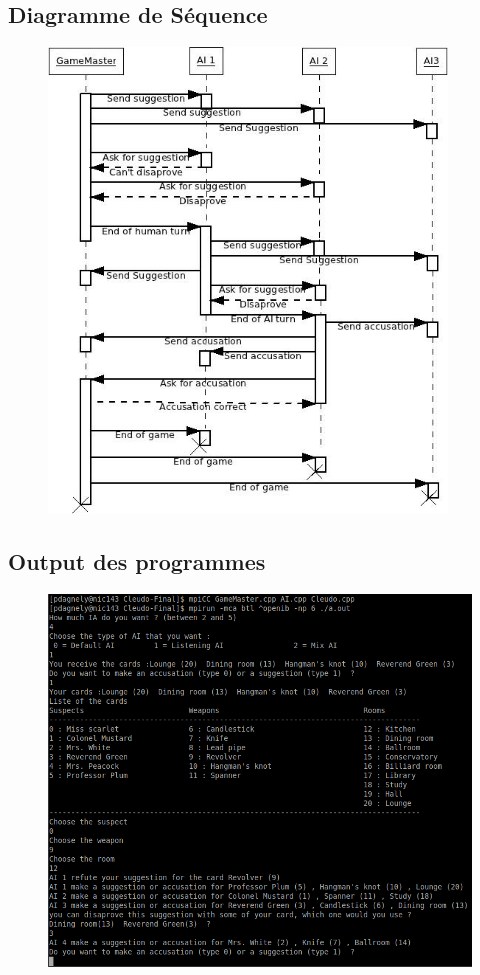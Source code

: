\documentclass[a4paper,10pt]{article}
\begin{document}
	\subsection{Diagramme de Séquence}\hypertarget{seqDiag}{}
		\begin{figure}[H] \hspace*{-2cm} 
    	\centering
   		  \includegraphics[width=300pt]{Diag-Sequence.jpeg} 
	  	\end{figure}	 
	 
	 \subsection{Output des programmes}
		\begin{figure}[H] \hspace*{-2cm} 
    	\centering
   		  \includegraphics[width=350pt]{output.png} 
	  	\end{figure}
	 
\end{document}
